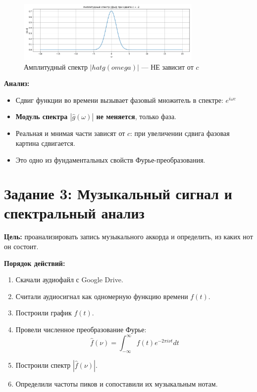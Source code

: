 \begin{figure}[h!]
    \centering
    \includegraphics[width=0.8\textwidth]{g_hat_magnitude_c-2.png}
    \caption{Амплитудный спектр $|hat{g}(omega)|$ — НЕ зависит от $c$}
\end{figure}

\textbf{Анализ:}

\begin{itemize}
    \item Сдвиг функции во времени вызывает фазовый множитель в спектре: $e^{i \omega c}$
    \item \textbf{Модуль спектра $|\hat{g}(\omega)|$ не меняется}, только фаза.
    \item Реальная и мнимая части зависят от $c$: при увеличении сдвига фазовая картина сдвигается.
    \item Это одно из фундаментальных свойств Фурье-преобразования.
\end{itemize}

\section*{Задание 3: Музыкальный сигнал и спектральный анализ}

\textbf{Цель:} проанализировать запись музыкального аккорда и определить, из каких нот он состоит.

\textbf{Порядок действий:}

\begin{enumerate}
    \item Скачали аудиофайл с Google Drive.
    \item Считали аудиосигнал как одномерную функцию времени $f(t)$.
    \item Построили график $f(t)$.
    \item Провели численное преобразование Фурье:
    \[
    \hat{f}(\nu) = \int_{-\infty}^{\infty} f(t) e^{-2\pi i \nu t} dt
    \]
    \item Построили спектр $|\hat{f}(\nu)|$.
    \item Определили частоты пиков и сопоставили их музыкальным нотам.
\end{enumerate}

